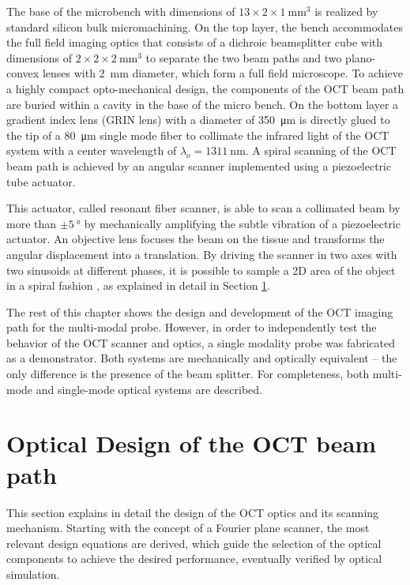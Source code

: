 The base of the microbench with dimensions of $13 \times 2 \times \SI{1}{\milli\meter^3} $ is realized by standard silicon bulk micromachining. On the top layer, the bench accommodates the full field imaging optics that consists of a dichroic beamsplitter cube with dimensions of $2\times 2 \times  \SI{2}{\milli\meter^3}$ to separate the two beam paths and two plano-convex lenses with \SI{2}{\milli\meter} diameter, which form a full field microscope. To achieve a highly compact opto-mechanical design, the components of the OCT beam path are buried within a cavity in the base of the micro bench. On the bottom layer a gradient index lens (GRIN lens) with a diameter of \SI{350}{\micro\meter} is directly glued to the tip of a \SI{80}{\micro\meter} single mode fiber to collimate the infrared light of the OCT system with a center wavelength of $\lambda_o = \SI{1311}{\nano\meter}$. A spiral scanning of the OCT beam path is achieved by an angular scanner implemented using a piezoelectric tube actuator.

This actuator, called resonant fiber scanner, is able to scan a collimated beam by more than $\pm \SI{5}{\degree}$ by mechanically amplifying the subtle vibration of a piezoelectric actuator.  An objective lens focuses the beam on the tissue and transforms the angular displacement into a translation. By driving the scanner in two axes with two sinusoids at different phases, it is possible to sample a 2D area of the object in a spiral fashion \cite{Seibel2006}, as explained in detail in Section \ref{sec:Optical}.

The rest of this chapter shows the design and development of the OCT imaging path for the multi-modal probe. However, in order to independently test the behavior of the OCT scanner and optics, a single modality probe was fabricated as a demonstrator. Both systems are mechanically and optically equivalent -- the only difference is the presence of the beam splitter. 
For completeness, both multi-mode and single-mode optical systems are described.


\section{Optical Design of the OCT beam path}
\label{sec:Optical}
This section explains in detail the design of the OCT optics and its scanning mechanism. Starting with the concept of a Fourier plane scanner, the most relevant design equations are derived, which guide the selection of the optical components to achieve the desired performance, eventually verified by optical simulation. 


